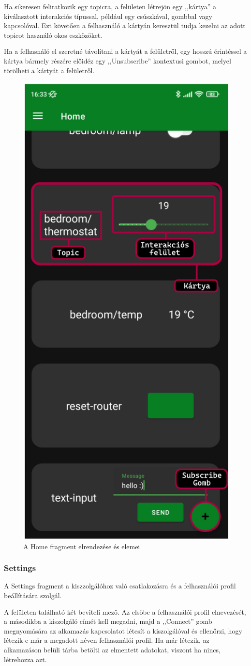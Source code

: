 \documentclass[
]{thesis-ekf}
\theoremstyle{definition}
\theoremstyle{remark}
\begin{document}
Ha sikeresen feliratkozik egy topicra, a felületen létrejön
egy ,,kártya'' a kiválasztott interakciós típussal, például egy csúszkával, gombbal vagy kapcsolóval. Ezt követően a felhasználó a
kártyán keresztül tudja kezelni az adott topicot használó okos eszközöket. 

Ha a felhasnáló el szeretné távolítani a kártyát a felületről,
egy hosszú érintéssel a kártya bármely részére előidéz egy ,,Unsubscribe'' kontextusi gombot, melyel törölheti a kártyát a felületről.

\begin{figure}[H]
	\centering
	\includegraphics[width=0.5\linewidth]{images/home_anatomy.png}
	\caption{A Home fragment elrendezése és elemei}
	\label{fig_home_anatomy}
\end{figure}
	
\subsubsection{Settings}
A Settings fragment a kiszzolgálóhoz való csatlakozásra és a felhasználói profil beállítására szolgál.

A felületen található két beviteli mező. Az elsőbe a felhasználói profil elnevezését, a másodikba a kiszolgáló címét
kell megadni, majd a ,,Connect'' gomb megnyomására az alkamazás kapcsolatot létesít a kiszolgálóval és ellenőrzi, hogy
létezik-e már a megadott néven felhasználói profil. Ha már létezik, az alkamazáson belüli tárba betölti az elmentett adatokat,
viszont ha nincs, létrehozza azt.
\end{document}
